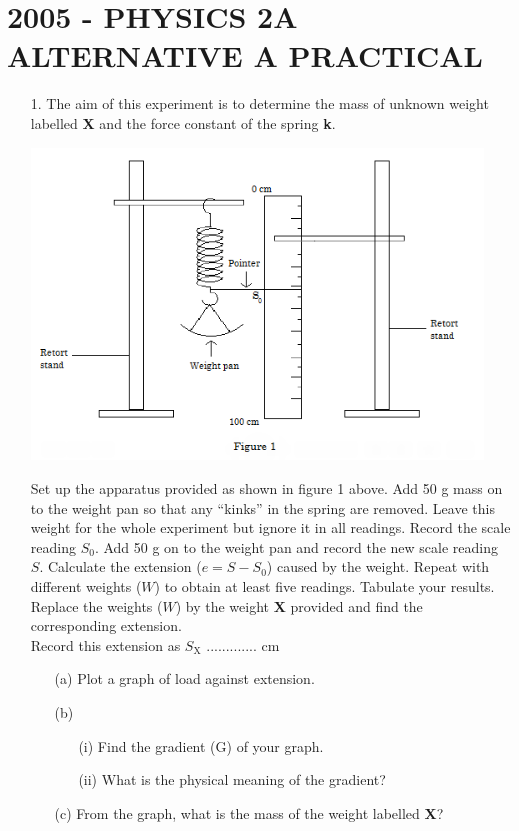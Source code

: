 \section{2005 - PHYSICS 2A ALTERNATIVE A PRACTICAL}

\begin{enumerate}
\item[1.] The aim of this experiment is to determine the mass of unknown weight labelled \textbf{X} and the force constant of the spring \textbf{k}.

\begin{center}
\includegraphics[width=12cm]{./img/2005-1-alt.png}
\end{center}

Set up the apparatus provided as shown in figure 1 above. Add 50 g mass on to the weight pan so that any ``kinks'' in the spring are removed. Leave this weight for the whole experiment but ignore it in all readings. Record the scale reading $S_0$. Add 50 g on to the weight pan and record the new scale reading $S$. Calculate the extension ($e = S - S_0$) caused by the weight. Repeat with different weights ($W$) to obtain at least five readings. Tabulate your results. Replace the weights ($W$) by the weight \textbf{X} provided and find the corresponding extension.\\[10pt]

Record this extension as $S_{\text{X}}$ ............. cm

\begin{enumerate}
\item[(a)] Plot a graph of load against extension.
\item[(b)]
\begin{enumerate}
\item[(i)] Find the gradient (G) of your graph.
\item[(ii)] What is the physical meaning of the gradient?
\end{enumerate}
\item[(c)] From the graph, what is the mass of the weight labelled \textbf{X}?
\end{enumerate}


\end{enumerate}
